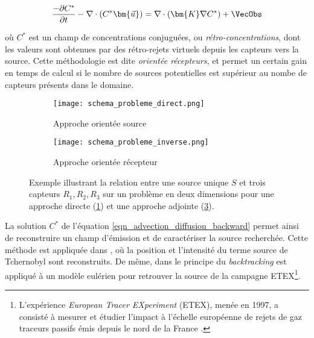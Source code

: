	 \begin{equation}
	 \label{eqn_advection_diffusion_backward}
	 \dfrac{-\partial C^*}{\partial t} - \nabla \cdot(C^*\bm{\vec{u}}) = \nabla \cdot (\bm{K}\nabla C^*) + \VecObs
	 \end{equation}
	 
	 où $C^*$ est un champ de concentrations conjuguées, ou \textit{rétro-concentrations}, dont les valeurs sont obtenues par des rétro-rejets virtuels depuis les capteurs vers la source. Cette méthodologie est dite \textit{orientée récepteurs}, et permet un certain gain en temps de calcul si le nombre de sources potentielles est supérieur au nombe de capteurs présents dans le domaine. \\
	 
	\begin{figure}[h]
		\begin{subfigure}{0.5\textwidth}
			\texttt{[image: schema\_probleme\_direct.png]}
			\caption{Approche orientée source}
			\label{schema_probleme_direct}
		\end{subfigure}
		\begin{subfigure}{0.5\textwidth}
		\texttt{[image: schema\_probleme\_inverse.png]}
		\caption{Approche orientée récepteur}
		\label{schema_probleme_inverse}
	\end{subfigure}
	\caption{Exemple illustrant la relation entre une source unique $S$ et trois capteurs $R_1,R_2,R_3$ sur un problème en deux dimensions pour une approche directe (\ref{schema_probleme_direct}) et une approche adjointe (\ref{schema_probleme_inverse}). }
	\end{figure}
	

	La solution $C^*$ de l'équation \eqref{eqn_advection_diffusion_backward} permet ainsi de reconstruire un champ d'émission et de caractériser la source recherchée. Cette méthode est appliquée dans \cite{Pudykiewicz1998}, où la position et l'intensité du terme source de Tchernobyl sont reconstruits. De même, dans \cite{Hourdin2006b} le principe du \textit{backtracking} est appliqué à un modèle eulérien pour retrouver la source de la campagne ETEX\footnote{L’expérience \textit{European Tracer EXperiment} (ETEX), menée en 1997,  a consisté à mesurer et étudier l'impact à l'échelle européenne de rejets de gaz traceurs passifs émis depuis le nord de la France \cite{Nodop1998}.}.
	
